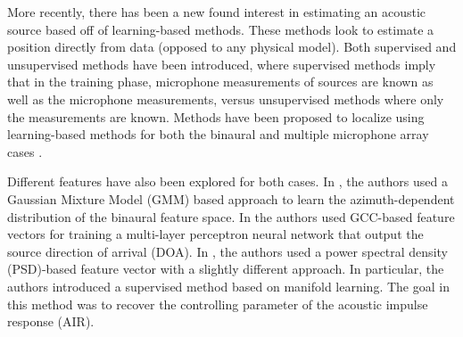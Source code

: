 \documentclass{article}
\begin{document}
More recently, there has been a new found interest in estimating an acoustic source based off of learning-based methods. These methods look to estimate a position directly from data (opposed to any physical model). Both supervised and unsupervised methods have been introduced, where supervised methods imply that in the training phase, microphone measurements of sources are known as well as the microphone measurements, versus unsupervised methods where only the measurements are known. Methods have been proposed to localize using learning-based methods for both the binaural and multiple microphone array cases \cite{AD_2dSoundsourceLocalBinMani, AD_VariEMforBinSoundSepAndLocal, AD_acousticSpaceLearningforSoundSep}. 

Different features have also been explored for both cases. In \cite{TM_probModelRobustLocalizationBinauralAudioFront}, the authors used a Gaussian Mixture Model (GMM) based approach to learn the azimuth-dependent distribution of the binaural feature space. In \cite{XX_learningApproachDoaEstimation} the authors used GCC-based feature vectors for training a multi-layer perceptron neural network that output the source direction of arrival (DOA). In \cite{BLG_rtfModelingSupervisedSourceLocalization}, the authors used a power spectral density (PSD)-based feature vector with a slightly different approach. In particular, the authors introduced a supervised method based on manifold learning. The goal in this method was to recover the controlling parameter of the acoustic impulse response (AIR).
\end{document}
